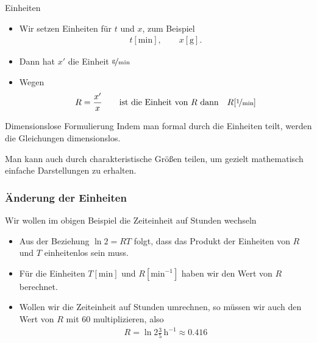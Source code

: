 \begin{frame}{Einheiten}
  \begin{minipage}{.9\textwidth}
  \begin{itemize}
  \item Wir setzen Einheiten für $t$ und $x$, zum Beispiel
    \begin{gather*}
      t[\text{min}],\qquad x[\text{g}].
    \end{gather*}
  \item Dann hat $x'$ die Einheit $\nicefrac{\text{g}}{\text{min}}$
  \item Wegen
    \begin{gather*}
      R = \frac{x'}{x} \qquad\text{ist die Einheit von $R$ dann}\quad R[\nicefrac1{\text{min}}]
    \end{gather*}
  \end{itemize}    
  \end{minipage}
  \pause
  \begin{block}{Dimensionslose Formulierung}
    Indem man formal durch die Einheiten teilt, werden die Gleichungen
    dimensionslos.

    \vspace{1ex}

    Man kann auch durch charakteristische Größen teilen, um gezielt
    mathematisch einfache Darstellungen zu erhalten.
  \end{block}
\end{frame}

\begin{frame}
  \frametitle<presentation>{Änderung der Einheiten}
  Wir wollen im obigen Beispiel die Zeiteinheit auf Stunden wechseln
  \begin{itemize}
  \item Aus der Beziehung $\ln 2 = RT$ folgt, dass das Produkt der
    Einheiten von $R$ und $T$ einheitenlos sein muss.
  \item Für die Einheiten $T[\text{min}]$ und $R[\text{min}^{-1}]$
    haben wir den Wert von $R$ berechnet.
  \item Wollen wir die Zeiteinheit auf Stunden umrechnen, so müssen
    wir auch den Wert von $R$ mit 60 multiplizieren, also
    \begin{gather*}
      R = \ln 2\frac35\,\text{h}^{-1} \approx 0.416
    \end{gather*}
  \end{itemize}
\end{frame}

